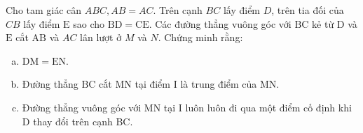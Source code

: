 \begin{bt}
    Cho tam giác cân $A B C, A B=A C$. Trên cạnh $B C$ lấy điểm $D$, trên tia đối của $C B$ lấy điểm $\mathrm{E}$ sao cho $\mathrm{BD}=\mathrm{CE}$. Các đường thẳng vuông góc với $\mathrm{BC}$ kẻ từ $\mathrm{D}$ và $\mathrm{E}$ cắt $\mathrm{AB}$ và $A C$ lân lượt ở $M$ và $N$. Chứng minh rằng: 
    \begin{enumerate}[a.]
    \item $\mathrm{DM}=\mathrm{EN}$.
    \item Đường thẳng $\mathrm{BC}$ cắt $\mathrm{MN}$ tại điểm $\mathrm{I}$ là trung điểm của $\mathrm{MN}$.
    \item Đường thẳng vuông góc với $\mathrm{MN}$ tại I luôn luôn đi qua một điểm cố định khi $\mathrm{D}$ thay đổi trên cạnh BC.
    \end{enumerate}
\end{bt}
